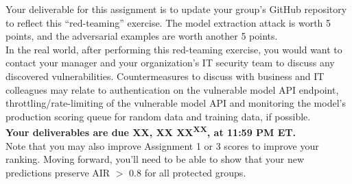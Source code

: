 \documentclass[fleqn]{article}
\begin{document}
Your deliverable for this assignment is to update your group's GitHub repository to reflect this ``red-teaming'' exercise. The model extraction attack is worth 5 points, and the adversarial examples are worth another 5 points. \\

\noindent In the real world, after performing this red-teaming exercise, you would want to contact your manager and your organization's IT security team to discuss any discovered vulnerabilities. Countermeasures to discuss with business and IT colleagues may relate to authentication on the vulnerable model API endpoint, throttling/rate-limiting of the vulnerable model API and monitoring the model's production scoring queue for random data and training data, if possible.\\

\noindent \textbf{Your deliverables are due XX, XX XX\textsuperscript{XX}, at 11:59 PM ET.}\\

\noindent Note that you may also improve Assignment 1 or 3 scores to improve your ranking. Moving forward, you'll need to be able to show that your new predictions preserve AIR $>$ 0.8 for all protected groups.
\end{document}
